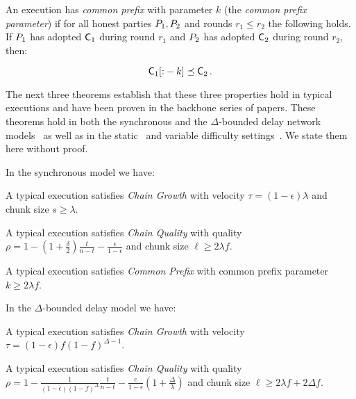 \begin{definition}
  An execution has \emph{common prefix} with parameter $k$ (the \emph{common
  prefix parameter}) if for all honest parties $P_1, P_2$ and rounds
  $r_1 \leq r_2$ the following holds. If $P_1$ has adopted $\mathsf{C}_1$
  during round $r_1$ and $P_2$ has adopted $\mathsf{C}_2$ during round $r_2$,
  then:

  \[
  \mathsf{C}_1[{:}-k] \preceq \mathsf{C}_2
  \,.
  \]
\end{definition}

The next three theorems establish that these three properties hold in typical
executions and have been proven in the backbone series of papers. These theorems
hold in both the synchronous and the $\Delta$-bounded delay network
models~\cite{pass-asynchronous} as well as in the static~\cite{backbone} and
variable difficulty settings~\cite{varbackbone}. We state them here without
proof.

In the synchronous model we have:

\begin{theorem}
  A typical execution satisfies \emph{Chain Growth} with
  velocity $\tau = (1 - \epsilon)\lambda$ and chunk size $s \geq \lambda$.
\end{theorem}

\begin{theorem}
  A typical execution satisfies \emph{Chain Quality} with quality
  $\rho = 1 - (1 + \frac{\delta}{2})\frac{t}{n - t} - \frac{\epsilon}{1 - \epsilon}$
  and chunk size $\ell \geq 2\lambda f$.
\end{theorem}

\begin{theorem}
  A typical execution satisfies \emph{Common Prefix} with common prefix
  parameter $k \geq 2\lambda f$.
\end{theorem}

In the $\Delta$-bounded delay model we have:

\begin{theorem}
  A typical execution satisfies \emph{Chain Growth} with
  velocity $\tau = (1 - \epsilon)f(1 - f)^{\Delta - 1}$.
\end{theorem}

\begin{theorem}
  A typical execution satisfies \emph{Chain Quality} with
  quality
  $\rho = 1 - \frac{1}{(1 - \epsilon)(1 - f)^\Delta}\frac{t}{n - t} - \frac{e}{1 - \epsilon}(1 + \frac{\Delta}{\lambda})$
  and chunk size $\ell \geq 2\lambda f + 2\Delta f$.
\end{theorem}

